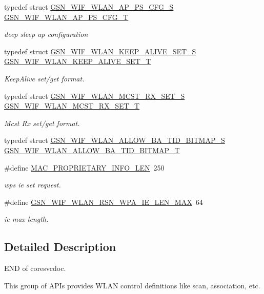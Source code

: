 \begin{DoxyCompactItemize}
typedef struct \hyperlink{a00368}{GSN\_\-WIF\_\-WLAN\_\-AP\_\-PS\_\-CFG\_\-S} \hyperlink{a00677_ga5b778f6fbad2d264cc6e8d03a61b7a42}{GSN\_\-WIF\_\-WLAN\_\-AP\_\-PS\_\-CFG\_\-T}
\begin{DoxyCompactList}\small\item\em deep sleep ap configuration \end{DoxyCompactList}\item 
typedef struct \hyperlink{a00385}{GSN\_\-WIF\_\-WLAN\_\-KEEP\_\-ALIVE\_\-SET\_\-S} \hyperlink{a00677_ga05b94921534c912004364babe9d0c9e9}{GSN\_\-WIF\_\-WLAN\_\-KEEP\_\-ALIVE\_\-SET\_\-T}
\begin{DoxyCompactList}\small\item\em KeepAlive set/get format. \end{DoxyCompactList}\item 
typedef struct \hyperlink{a00389}{GSN\_\-WIF\_\-WLAN\_\-MCST\_\-RX\_\-SET\_\-S} \hyperlink{a00677_ga1c35c53aa2b78b1856a8fe1233b8368e}{GSN\_\-WIF\_\-WLAN\_\-MCST\_\-RX\_\-SET\_\-T}
\begin{DoxyCompactList}\small\item\em Mcst Rx set/get format. \end{DoxyCompactList}\item 
typedef struct \hyperlink{a00365}{GSN\_\-WIF\_\-WLAN\_\-ALLOW\_\-BA\_\-TID\_\-BITMAP\_\-S} \hyperlink{a00677_gafb05388636305e014ec95505951eca42}{GSN\_\-WIF\_\-WLAN\_\-ALLOW\_\-BA\_\-TID\_\-BITMAP\_\-T}
\item 
\#define \hyperlink{a00677_ga061dde080c4358e4caf65cfb37d5c3cd}{MAC\_\-PROPRIETARY\_\-INFO\_\-LEN}~250
\begin{DoxyCompactList}\small\item\em wps ie set request. \end{DoxyCompactList}\item 
\#define \hyperlink{a00677_gad043f51474c04cc30a14d7d36d0d38f4}{GSN\_\-WIF\_\-WLAN\_\-RSN\_\-WPA\_\-IE\_\-LEN\_\-MAX}~64
\begin{DoxyCompactList}\small\item\em ie max length. \end{DoxyCompactList}\end{DoxyCompactItemize}


\subsection{Detailed Description}
END of coresvcdoc.

This group of APIs provides WLAN control definitions like scan, association, etc. 


